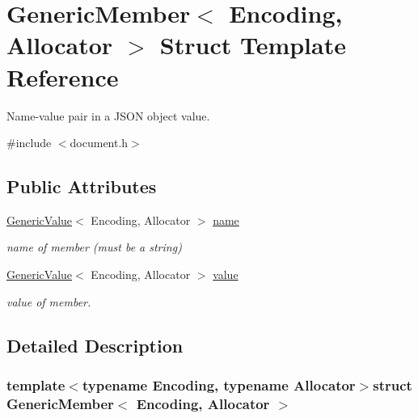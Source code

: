 \hypertarget{struct_generic_member}{}\section{Generic\+Member$<$ Encoding, Allocator $>$ Struct Template Reference}
\label{struct_generic_member}


Name-\/value pair in a J\+S\+O\+N object value.  




{\ttfamily \#include $<$document.\+h$>$}

\subsection*{Public Attributes}
\begin{DoxyCompactItemize}
\item 
\hypertarget{struct_generic_member_a7124f7ccd67421533d33139938604fac}{}\hyperlink{class_generic_value}{Generic\+Value}$<$ Encoding, Allocator $>$ \hyperlink{struct_generic_member_a7124f7ccd67421533d33139938604fac}{name}\label{struct_generic_member_a7124f7ccd67421533d33139938604fac}

\begin{DoxyCompactList}\small\item\em name of member (must be a string) \end{DoxyCompactList}\item 
\hypertarget{struct_generic_member_aad3cfa4f9e8b9018068c8bc865723083}{}\hyperlink{class_generic_value}{Generic\+Value}$<$ Encoding, Allocator $>$ \hyperlink{struct_generic_member_aad3cfa4f9e8b9018068c8bc865723083}{value}\label{struct_generic_member_aad3cfa4f9e8b9018068c8bc865723083}

\begin{DoxyCompactList}\small\item\em value of member. \end{DoxyCompactList}\end{DoxyCompactItemize}


\subsection{Detailed Description}
\subsubsection*{template$<$typename Encoding, typename Allocator$>$struct Generic\+Member$<$ Encoding, Allocator $>$}


